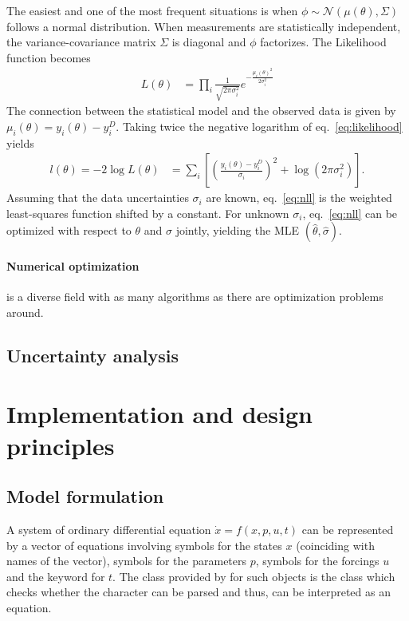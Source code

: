 \documentclass[article]{jss}
\begin{document}
The easiest and one of the most frequent situations is when $\phi\sim\mathcal N(\mu(\theta), \Sigma)$ follows a normal distribution. When measurements are statistically independent, the variance-covariance matrix $\Sigma$ is diagonal and $\phi$ factorizes. The Likelihood function becomes
\begin{align}
	L(\theta) &= \prod_i \frac{1}{\sqrt{2\pi\sigma_i^2}} e^{-\frac{\mu_i(\theta)^2}{2\sigma_i^2}} 
	\label{eq:likelihood}
\end{align}
The connection between the statistical model and the observed data is given by $\mu_i(\theta) = y_i(\theta) - y_i^D$. Taking twice the negative logarithm of eq.~\eqref{eq:likelihood} yields
\begin{align}
	l(\theta) = -2\log L(\theta) &= \sum_i \left[\left(\frac{y_i(\theta) - y_i^D}{\sigma_i}\right)^2 + \log(2\pi\sigma_i^2)\right].
	\label{eq:nll}
\end{align}
Assuming that the data uncertainties $\sigma_i$ are known, eq.~\eqref{eq:nll} is the weighted least-squares function shifted by a constant. For unknown $\sigma_i$, eq.~\eqref{eq:nll} can be optimized with respect to $\theta$ and $\sigma$ jointly, yielding the MLE $(\hat\theta, \hat\sigma)$.

\paragraph{Numerical optimization} is a diverse field with as many algorithms as there are optimization problems around.  




\subsection{Uncertainty analysis}



\section{Implementation and design principles}
\label{sec:implementation}

\subsection{Model formulation}

A system of ordinary differential equation $\dot x = f(x, p, u, t)$ can be represented by a  vector of equations involving symbols for the states $x$ (coinciding with names of the vector), symbols for the parameters $p$, symbols for the forcings $u$ and the keyword  for $t$. The class provided by  for such objects is the  class which checks whether the character can be parsed and thus, can be interpreted as an equation.
\end{document}
